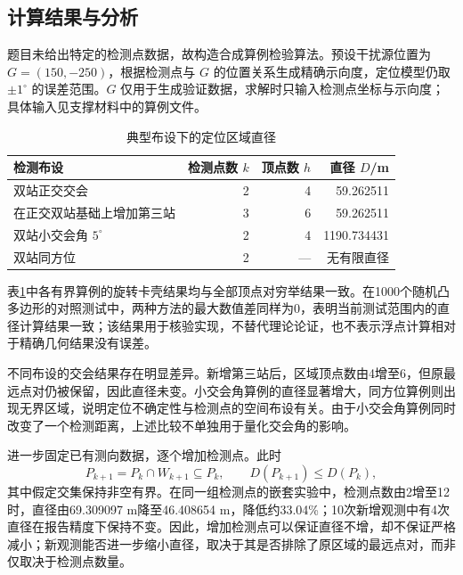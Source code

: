 \subsection{计算结果与分析}

题目未给出特定的检测点数据，故构造合成算例检验算法。预设干扰源位置为 $G=(150,-250)$，根据检测点与 $G$ 的位置关系生成精确示向度，定位模型仍取 $\pm1^\circ$ 的误差范围。$G$ 仅用于生成验证数据，求解时只输入检测点坐标与示向度；具体输入见支撑材料中的算例文件。

\begin{table}[htbp]
    \centering
    \caption{典型布设下的定位区域直径}
    \label{tab:p1-results-concise}
    \begin{tabular}{lrrr}
        \toprule
        检测布设 & 检测点数 $k$ & 顶点数 $h$ & 直径 $D$/m \\
        \midrule
        双站正交交会 & 2 & 4 & 59.262511 \\
        在正交双站基础上增加第三站 & 3 & 6 & 59.262511 \\
        双站小交会角 $5^\circ$ & 2 & 4 & 1190.734431 \\
        双站同方位 & 2 & --- & 无有限直径 \\
        \bottomrule
    \end{tabular}
\end{table}

表\ref{tab:p1-results-concise}中各有界算例的旋转卡壳结果均与全部顶点对穷举结果一致。在1000个随机凸多边形的对照测试中，两种方法的最大数值差同样为0，表明当前测试范围内的直径计算结果一致；该结果用于核验实现，不替代理论论证，也不表示浮点计算相对于精确几何结果没有误差。

不同布设的交会结果存在明显差异。新增第三站后，区域顶点数由4增至6，但原最远点对仍被保留，因此直径未变。小交会角算例的直径显著增大，同方位算例则出现无界区域，说明定位不确定性与检测点的空间布设有关。由于小交会角算例同时改变了一个检测距离，上述比较不单独用于量化交会角的影响。

进一步固定已有测向数据，逐个增加检测点。此时
\begin{equation}
    P_{k+1}=P_k\cap W_{k+1}\subseteq P_k,
    \qquad D(P_{k+1})\le D(P_k),
\end{equation}
其中假定交集保持非空有界。在同一组检测点的嵌套实验中，检测点数由2增至12时，直径由69.309097 m降至46.408654 m，降低约33.04\%；10次新增观测中有4次直径在报告精度下保持不变。因此，增加检测点可以保证直径不增，却不保证严格减小；新观测能否进一步缩小直径，取决于其是否排除了原区域的最远点对，而非仅取决于检测点数量。
